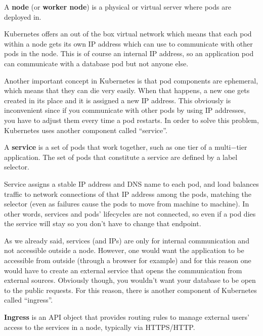 A \textbf{node} (or \textbf{worker node}) is a physical or virtual server where pods are deployed in.
\ed


Kubernetes offers an out of the box virtual network which means that each pod within a node gets its own IP address
which can use to communicate with other pods in the node. This is of course an internal IP address, so an application
pod can communicate with a database pod but not anyone else.


Another important concept in Kubernetes is that pod components are ephemeral, which means that they can die very
easily. When that happens, a new one gets created in its place and it is assigned a new IP address. This obviously is
inconvenient since if you communicate with other pods by using IP addresses, you have to adjust them every time a pod
restarts. In order to solve this problem, Kubernetes uses another component called ``service''.

\bd[Service]
A \textbf{service} is a set of pods that work together, such as one tier of a multi$-$tier application. The set of
pods that constitute a service are defined by a label selector.
\ed

Service assigns a stable IP address and DNS name to each pod, and load balances traffic to network connections of
that IP address among the pods, matching the selector (even as failures cause the pods to move from machine to
machine). In other words, services and pods' lifecycles are not connected, so even if a pod dies the service will
stay so you don't have to change that endpoint.


As we already said, services (and IPs) are only for internal communication and not accessible outside a node.
However, one would want the application to be accessible from outside (through a browser for example) and for this
reason one would have to create an external service that opens the communication from external sources. Obviously
though, you wouldn't want your database to be open to the public requests. For this reason, there is another
component of Kubernetes called ``ingress''.

\bd[Ingress]
\textbf{Ingress} is an API object that provides routing rules to manage external users' access to the services in a
node, typically via HTTPS/HTTP.
\ed


